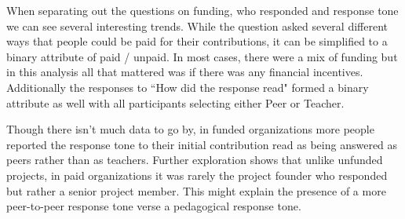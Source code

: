 When separating out the questions on funding, who responded and response tone we can see several interesting trends. While the question asked several different ways that people could be paid for their contributions, it can be simplified to a binary attribute of paid / unpaid. In most cases, there were a mix of funding but in this analysis all that mattered was if there was any financial incentives. Additionally the responses to ``How did the response read" formed a binary attribute as well with all participants selecting either Peer or Teacher.

Though there isn't much data to go by, in funded organizations more people reported the response tone to their initial contribution read as being answered as peers rather than as teachers. Further exploration shows that unlike unfunded projects, in paid organizations it was rarely the project founder who responded but rather a senior project member. This might explain the presence of a more peer-to-peer response tone verse a pedagogical response tone.